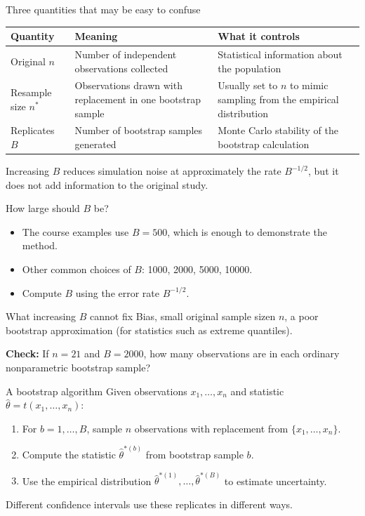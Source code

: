 \documentclass[aspectratio=169,11pt]{beamer}
\begin{document}
\begin{frame}{Three quantities that may be easy to confuse}
  \begin{center}
  \begin{tabular}{>{\raggedright\arraybackslash}p{}
                  >{\raggedright\arraybackslash}p{}
                  >{\raggedright\arraybackslash}p{}}
    \toprule
    \textbf{Quantity} & \textbf{Meaning} & \textbf{What it controls} \\
    \midrule
    Original \(n\) & Number of independent observations collected & Statistical information about the population \\
    Resample size \(n^*\) & Observations drawn with replacement in one bootstrap sample & Usually set to \(n\) to mimic sampling from the empirical distribution \\
    Replicates \(B\) & Number of bootstrap samples generated & Monte Carlo stability of the bootstrap calculation \\
    \bottomrule
  \end{tabular}
  \end{center}
  \vfill
  Increasing \(B\) reduces simulation noise at approximately the rate \(B^{-1/2}\),
  but it does \alert{not} add information to the original study.
\end{frame}

\begin{frame}{How large should \(B\) be?}
  \begin{itemize}
    \item The course examples use \(B=500\), which is enough to demonstrate the method.
    \item Other common choices of \(B\): 1000, 2000, 5000, 10000.
    \item Compute \(B\) using the error rate \(B^{-1/2}\).
  \end{itemize}
  \begin{alertblock}{What increasing \(B\) cannot fix}
    Bias, small original sample sizen $n$, a poor bootstrap approximation
    (for statistics such as extreme quantiles).
  \end{alertblock}
  \textbf{Check:} If \(n=21\) and \(B=2000\), how many observations are in each
  ordinary nonparametric bootstrap sample?
\end{frame}

\begin{frame}{A bootstrap algorithm}
  Given observations \(x_1,\ldots,x_n\) and statistic
  \(\widehat\theta=t(x_1,\ldots,x_n)\):
  \begin{enumerate}
    \item For \(b=1,\ldots,B\), sample \(n\) observations with replacement from
          \(\{x_1,\ldots,x_n\}\).
    \item Compute the statistic \(\widehat\theta^{*(b)}\) from bootstrap sample \(b\).
    \item Use the empirical distribution
          \(\widehat\theta^{*(1)},\ldots,\widehat\theta^{*(B)}\)
          to estimate uncertainty.
  \end{enumerate}
  \vfill
  Different confidence intervals use these replicates in different ways.
\end{frame}
\end{document}
